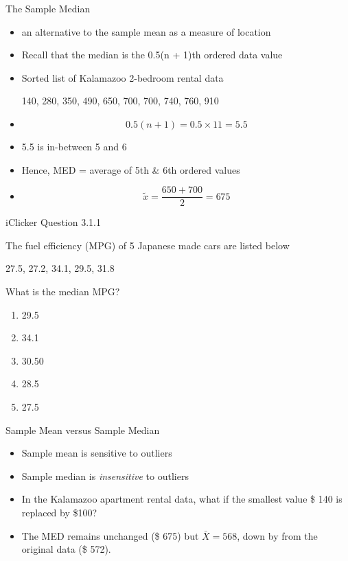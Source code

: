 \documentclass[14pt]{beamer}\usepackage[]{graphicx}\usepackage[]{color}
\begin{document}
\begin{frame}[fragile]{The Sample Median}



{\footnotesize{
\begin{itemize}
\item<1-> an alternative to the sample mean as a measure of location

\item<1-> Recall that the median is the 0.5(n + 1)th ordered data value

\item<1-> Sorted list of Kalamazoo 2-bedroom rental data

\vspace{3mm}

140, 280, 350, 490, 650, 700, 700, 740, 760, 910
\item<2->
\begin{equation*}
0.5(n + 1) = 0.5 \times 11 = 5.5
\end{equation*}

\item<3-> 5.5 is in-between 5 and 6
\item<4-> Hence, MED = average of 5th \& 6th ordered values
\item<5->
\begin{equation*}
\tilde{x} = \frac{ 650 + 700 }{2} = 675
\end{equation*}
\end{itemize}
}}
\end{frame}

\begin{frame}[fragile]{iClicker Question 3.1.1}


The fuel efficiency (MPG) of 5 Japanese made cars are listed below

\begin{center}
27.5, 27.2, 34.1, 29.5, 31.8
\end{center}

What is the median MPG?

\begin{enumerate}
\item 29.5
\item 34.1
\item 30.50
\item 28.5
\item 27.5
\end{enumerate}
\end{frame}

\begin{frame}[fragile]{Sample Mean versus Sample Median}

\begin{itemize}
\item<1-> Sample mean is sensitive to outliers
\item<2-> Sample median is \textit{insensitive} to outliers
\item<3-> In the Kalamazoo apartment rental data, what if the smallest value \$ 140 is replaced by \$100?
\item<4-> The MED remains unchanged (\$ 675) but $\bar{X} = 568$, down by from the original data (\$ 572).
\end{itemize}
\end{frame}
\end{document}
